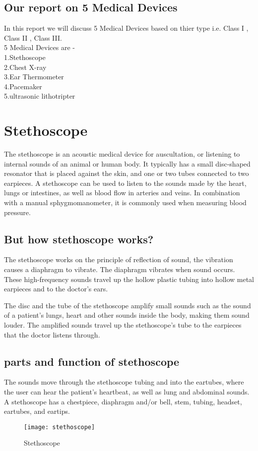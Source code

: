 \documentclass[12pt]{report}
\begin{document}
\subsection{Our report on 5 Medical Devices}
In this report we will discuss 5 Medical Devices  based on thier type i.e. Class I , Class II , Class III.\\
5 Medical Devices are -\\
1.Stethoscope\\
2.Chest X-ray\\
3.Ear Thermometer\\
4.Pacemaker\\
5.ultrasonic lithotripter\\
\clearpage

\section{Stethoscope}
The stethoscope is an acoustic medical device for auscultation, or listening to internal sounds of an animal or human body. It typically has a small disc-shaped resonator that is placed against the skin, and one or two tubes connected to two earpieces. A stethoscope can be used to listen to the sounds made by the heart, lungs or intestines, as well as blood flow in arteries and veins. In combination with a manual sphygmomanometer, it is commonly used when measuring blood pressure.

\subsection{But how stethoscope works?}
The stethoscope works on the principle of reflection of sound, the vibration causes a diaphragm to vibrate. The diaphragm vibrates when sound occurs. These high-frequency sounds travel up the hollow plastic tubing into hollow metal earpieces and to the doctor's ears.

The disc and the tube of the stethoscope amplify small sounds such as the sound of a patient's lungs, heart and other sounds inside the body, making them sound louder. The amplified sounds travel up the stethoscope's tube to the earpieces that the doctor listens through.

\subsection{parts and function of stethoscope}
The sounds move through the stethoscope tubing and into the eartubes, where the user can hear the patient's heartbeat, as well as lung and abdominal sounds. A stethoscope has a chestpiece, diaphragm and/or bell, stem, tubing, headset, eartubes, and eartips.
\begin{figure}[h]
\centering
\texttt{[image: stethoscope]}
\caption{Stethoscope}
\end{figure}
\clearpage
\end{document}
